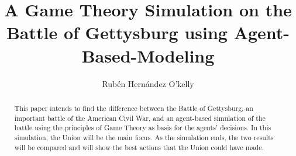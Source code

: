 \documentclass[final,5p,times,twocolumn,authoryear]{elsarticle}
\begin{document}
\begin{frontmatter}



\title{A Game Theory Simulation on the Battle of Gettysburg using Agent-Based-Modeling}

\author{Rubén Hernández O'kelly}

\begin{abstract}
This paper intends to find the difference between the Battle of Gettysburg, an important battle of the American Civil War, and an agent-based simulation of the battle using the principles of Game Theory as basis for the agents' decisions. In this simulation, the Union will be the main focus. As the simulation ends, the two results will be compared and will show the best actions that the Union could have made.
\end{abstract}



\end{frontmatter}
\end{document}
